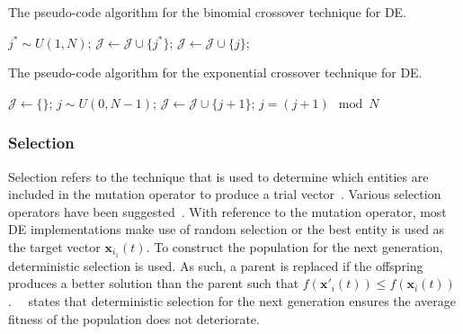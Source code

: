 \begin{algorithm}[htb]
      \caption{The pseudo-code algorithm for the binomial crossover technique for \acs{DE}.}
      \label{algo:heuristics:de:bin}
      \begin{algorithmic}
            \State $j^{*} \sim U(1,N)$;
            \State $\mathcal{J} \gets \mathcal{J} \cup \{j^{*}\}$;
            \State $\mathcal{J} \gets \mathcal{J} \cup \{j\}$;
            \EndIf
            \EndFor
      \end{algorithmic}
\end{algorithm}

\begin{algorithm}[htb]
      \caption{The pseudo-code algorithm for the exponential crossover technique for \acs{DE}.}
      \label{algo:heuristics:de:exp}
      \begin{algorithmic}
            \State $\mathcal{J} \gets \{\}$;
            \State $j \sim U(0,N - 1)$;
            \Repeat
            \State $\mathcal{J} \gets \mathcal{J} \cup \{j + 1 \}$;
            \State $j = (j+1) \mod N$
      \end{algorithmic}
\end{algorithm}

\subsubsection{Selection}\label{sec:heuristics:mh:de:selection}

Selection refers to the technique that is used to determine which entities are included in the mutation operator to produce a trial vector~\cite{ref:engelbrecht:2007}. Various selection operators have been suggested~\cite{ref:storn:1996, ref:storn:1997}. With reference to the mutation operator, most \acs{DE} implementations make use of random selection or the best entity is used as the target vector $\boldsymbol{x}_{i_{1}}(t)$. To construct the population for the next generation, deterministic selection is used. As such, a parent is replaced if the offspring produces a better solution than the parent such that $f(\boldsymbol{x}'_{i}(t)) \leq f(\boldsymbol{x}_{i}(t))$.~\citeauthor{ref:engelbrecht:2007}~\cite{ref:engelbrecht:2007} states that deterministic selection for the next generation ensures the average fitness of the population does not deteriorate.



